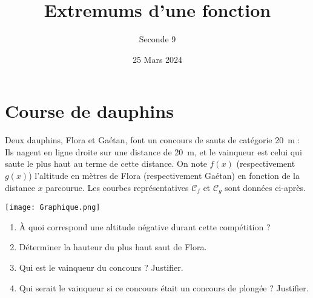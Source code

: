 \documentclass{article}
\title{Extremums d'une fonction}
\date{25 Mars 2024}
\author{Seconde 9}
\begin{document}
\maketitle
\section{Course de dauphins}
Deux dauphins, Flora et Gaétan, font un concours de sauts de catégorie \og \qty{20}{\m} \fg : Ils nagent en ligne droite sur une distance de \qty{20}{\m}, et le vainqueur est celui qui saute le plus haut au terme de cette distance. On note $f(x)$ (respectivement $g(x)$) l'altitude en mètres de Flora (respectivement Gaétan) en fonction de la distance $x$ parcourue. Les courbes représentatives $\mathcal{C}_f$ et $\mathcal{C}_g$ sont données ci-après.
\begin{center}
\texttt{[image: Graphique.png]}
\end{center}
\begin{enumerate}
\item À quoi correspond une altitude négative durant cette compétition ?
\item Déterminer la hauteur du plus haut saut de Flora.
\item Qui est le vainqueur du concours ? Justifier.
\item Qui serait le vainqueur si ce concours était un concours de plongée ? Justifier.
\end{enumerate}
\newpage
\end{document}
